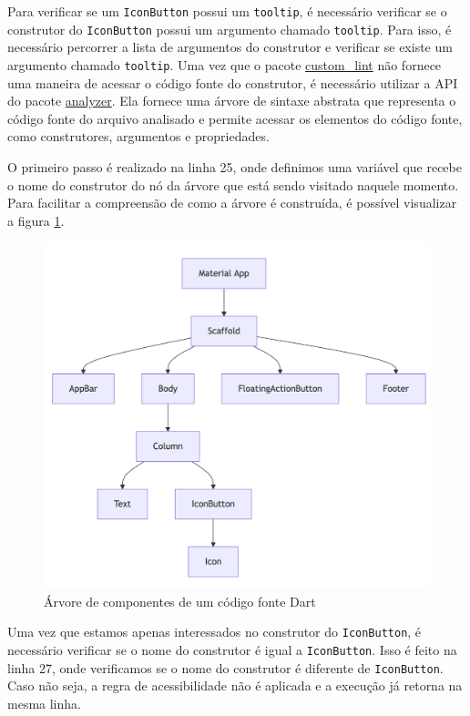 Para verificar se um \texttt{IconButton} possui um \texttt{tooltip}, é necessário verificar se o construtor do \texttt{IconButton} possui um argumento chamado \texttt{tooltip}. Para isso, é necessário percorrer a lista de argumentos do construtor e verificar se existe um argumento chamado \texttt{tooltip}. Uma vez que o pacote \href{https://pub.dev/packages/custom_lint}{custom\_lint} não fornece uma maneira de acessar o código fonte do construtor, é necessário utilizar a API do pacote \href{https://pub.dev/packages/analyzer}{analyzer}. Ela fornece uma árvore de sintaxe abstrata \cite{compiladores} que representa o código fonte do arquivo analisado e permite acessar os elementos do código fonte, como construtores, argumentos e propriedades.

O primeiro passo é realizado na linha 25, onde definimos uma variável  que recebe o nome do construtor do nó da árvore que está sendo visitado naquele momento. Para facilitar a compreensão de como a árvore é construída, é possível visualizar a figura \ref{fig:flutter-component-tree}.

\begin{figure}[!htbp]
	\centering
	\caption{Árvore de componentes de um código fonte Dart}
	\label{fig:flutter-component-tree}
	\includegraphics[width=325pt]{Assets/FlutterComponentTree.png}
\end{figure}

Uma vez que estamos apenas interessados no construtor do \texttt{IconButton}, é necessário verificar se o nome do construtor é igual a \texttt{IconButton}. Isso é feito na linha 27, onde verificamos se o nome do construtor é diferente de \texttt{IconButton}. Caso não seja, a regra de acessibilidade não é aplicada e a execução já retorna na mesma linha.

